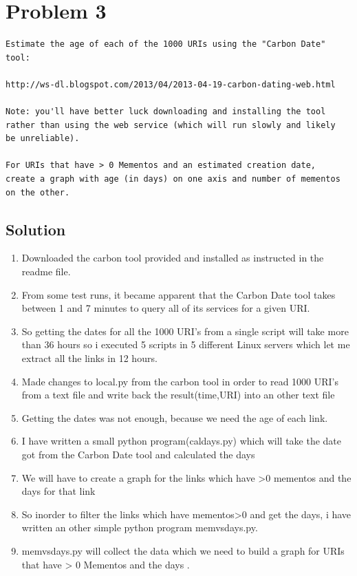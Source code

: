 \section{Problem 3}
\label{part3}
\begin{verbatim}
Estimate the age of each of the 1000 URIs using the "Carbon Date" tool:

http://ws-dl.blogspot.com/2013/04/2013-04-19-carbon-dating-web.html

Note: you'll have better luck downloading and installing the tool 
rather than using the web service (which will run slowly and likely
be unreliable).

For URIs that have > 0 Mementos and an estimated creation date,
create a graph with age (in days) on one axis and number of mementos
on the other.

\end{verbatim}
\subsection{Solution}
\begin{enumerate}

\item Downloaded the carbon tool provided and installed as instructed in the readme file. 
\item From some test runs, it became apparent that the Carbon Date tool takes between 1 and 7 minutes to query all of its services for a given URI. 
\item So getting the dates for all the 1000 URI's from a single script will take more than 36 hours so i executed 5 scripts in 5 different Linux servers which let me extract all the links in 12 hours. 
\item Made changes to local.py from the carbon tool 
in order to read 1000 URI's from a text file and write back the result(time,URI) into an other text file
\item Getting the dates was not enough, because we need the age of each link. 
\item I have written a small python program(caldays.py) which will take the date got from the Carbon Date tool and calculated the days 
\item We will have to create a graph for the links which have >0 mementos and the days for that link
\item So inorder to filter the links which have mementos>0 and get the days, i have written an other simple python program  memvsdays.py.
\item memvsdays.py will collect the data which we need to build a graph for URIs that have > 0 Mementos and the days . 

\end{enumerate}
\newpage
